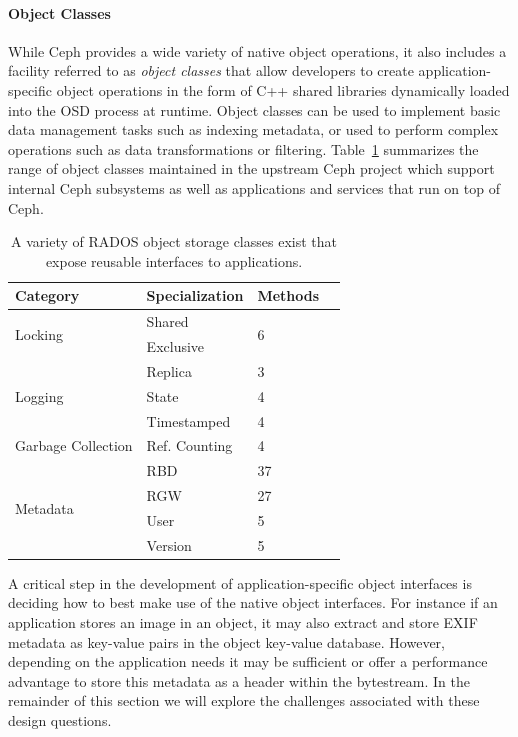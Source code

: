 \documentclass[10pt,twocolumn]{article}
\begin{document}
\paragraph*{Object Classes}
While Ceph provides a wide variety of native object operations, it also
includes a facility referred to as \emph{object classes} that allow developers
to create application-specific object operations in the form of C++ shared
libraries dynamically loaded into the OSD process at runtime.  Object classes
can be used to implement basic data management tasks such as indexing
metadata, or used to perform complex operations such as data transformations
or filtering. Table~\ref{tab:objclass-cats} summarizes the range of object
classes maintained in the upstream Ceph project which support internal Ceph
subsystems as well as applications and services that run on top of Ceph.

\begin{table}[ht]
\centering
\begin{tabularx}{\columnwidth}{|X|l|l|l|}
\hline
Category & Specialization & Methods \\ \hline
\multirow{2}{*}{Locking} & Shared & \multirow{2}{*}{6} \\
                         & Exclusive & \\ \hline
\multirow{3}{*}{Logging} & Replica & 3 \\
                         & State & 4 \\
                         & Timestamped & 4 \\ \hline
Garbage Collection & Ref. Counting & 4 \\ \hline
\multirow{4}{*}{Metadata} & RBD & 37 \\
 & RGW & 27 \\
 & User & 5 \\
 & Version & 5 \\ \hline
\end{tabularx}
\caption{A variety of RADOS object storage classes exist that expose reusable
interfaces to applications.}
\label{tab:objclass-cats}
\end{table}

A critical step in the development of application-specific object interfaces
is deciding how to best make use of the native object interfaces. For instance
if an application stores an image in an object, it may also extract and store
EXIF metadata as key-value pairs in the object key-value database.  However,
depending on the application needs it may be sufficient or offer a performance
advantage to store this metadata as a header within the bytestream. In the remainder
of this section we will explore the challenges associated with these design questions.
\end{document}
